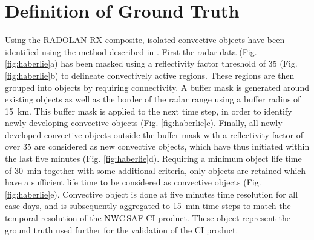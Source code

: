 \section{Definition of Ground Truth}
\label{sec:haci}
Using the RADOLAN RX composite, isolated convective objects have been identified using the method described in \citet{Haberlie_2015}. First the radar data (Fig. \ref{fig:haberlie}a) has been masked using a reflectivity factor threshold of \SI{35}{\dbZ} (Fig. \ref{fig:haberlie}b) to delineate convectively active regions. These regions are then grouped into objects by requiring connectivity. A buffer mask is generated around existing objects as well as the border of the radar range using a buffer radius of \SI{15}{\kilo\metre}. This buffer mask is applied to the next time step, in order to identify newly developing convective objects (Fig. \ref{fig:haberlie}c). Finally, all newly developed convective objects outside the buffer mask with a reflectivity factor of over \SI{35}{\dbZ} are considered as new convective objects, which have thus initiated within the last five minutes (Fig. \ref{fig:haberlie}d). Requiring a minimum object life time of \SI{30}{\minute} together with some additional  criteria, only objects are retained which have a sufficient life time to be considered as convective objects (Fig. \ref{fig:haberlie}e). Convective object  is done at five minutes time resolution for all case days, and is subsequently aggregated to \SI{15}{\minute} time steps to match the temporal resolution of the NWC\,SAF CI product. These object represent the ground truth used further for the validation of the CI product.

